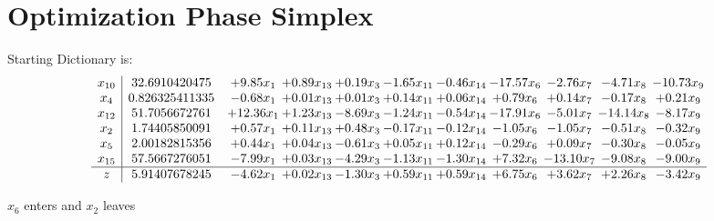 \documentclass[9pt]{article}
\begin{document}
\section{Optimization Phase Simplex}
Starting Dictionary is:
\[\begin{array}{c| c c@{\hskip 2pt} c@{\hskip 2pt} c@{\hskip 2pt} c@{\hskip 2pt} c@{\hskip 2pt} c@{\hskip 2pt} c@{\hskip 2pt} c@{\hskip 2pt} c@{\hskip 2pt} }
 x_{10}   &  32.6910420475 & +  9.85 x_{1} & +  0.89 x_{13} & +  0.19 x_{3} & -1.65 x_{11} & -0.46 x_{14} & -17.57 x_{6} & -2.76 x_{7} & -4.71 x_{8} & -10.73 x_{9}\\
 x_{4}   &  0.826325411335 & -0.68 x_{1} & +  0.01 x_{13} & +  0.01 x_{3} & +  0.14 x_{11} & +  0.06 x_{14} & +  0.79 x_{6} & +  0.14 x_{7} & -0.17 x_{8} & +  0.21 x_{9}\\
 x_{12}   &  51.7056672761 & + 12.36 x_{1} & +  1.23 x_{13} & -8.69 x_{3} & -1.24 x_{11} & -0.54 x_{14} & -17.91 x_{6} & -5.01 x_{7} & -14.14 x_{8} & -8.17 x_{9}\\
 x_{2}   &  1.74405850091 & +  0.57 x_{1} & +  0.11 x_{13} & +  0.48 x_{3} & -0.17 x_{11} & -0.12 x_{14} & -1.05 x_{6} & -1.05 x_{7} & -0.51 x_{8} & -0.32 x_{9}\\
 x_{5}   &  2.00182815356 & +  0.44 x_{1} & +  0.04 x_{13} & -0.61 x_{3} & +  0.05 x_{11} & +  0.12 x_{14} & -0.29 x_{6} & +  0.09 x_{7} & -0.30 x_{8} & -0.05 x_{9}\\
 x_{15}   &  57.5667276051 & -7.99 x_{1} & +  0.03 x_{13} & -4.29 x_{3} & -1.13 x_{11} & -1.30 x_{14} & +  7.32 x_{6} & -13.10 x_{7} & -9.08 x_{8} & -9.00 x_{9}\\
\hline
z    &  5.91407678245 & -4.62 x_{1} & +  0.02 x_{13} & -1.30 x_{3} & +  0.59 x_{11} & +  0.59 x_{14} & +  6.75 x_{6} & +  3.62 x_{7} & +  2.26 x_{8} & -3.42 x_{9}\\
\end{array}\]


 $ x_{6} $ enters and $ x_{2} $ leaves 
\end{document}
